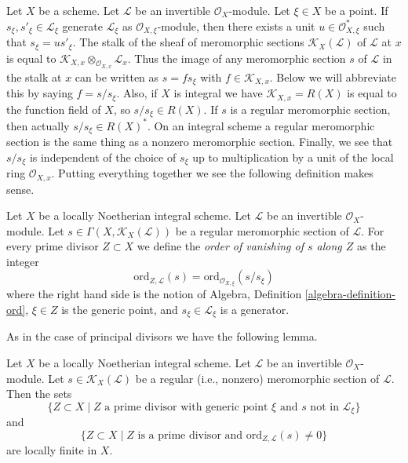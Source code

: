 \medskip\noindent
Let $X$ be a scheme. Let $\mathcal{L}$ be an invertible $\mathcal{O}_X$-module.
Let $\xi \in X$ be a point. If $s_\xi, s'_\xi \in \mathcal{L}_\xi$ generate
$\mathcal{L}_\xi$ as $\mathcal{O}_{X, \xi}$-module, then there exists a unit
$u \in \mathcal{O}_{X, \xi}^*$ such that $s_\xi = u s'_\xi$.
The stalk of the sheaf of meromorphic sections
$\mathcal{K}_X(\mathcal{L})$ of $\mathcal{L}$
at $x$ is equal to
$\mathcal{K}_{X, x} \otimes_{\mathcal{O}_{X, x}} \mathcal{L}_x$.
Thus the image of any meromorphic section $s$
of $\mathcal{L}$ in the stalk at $x$ can be written as $s = fs_\xi$ with
$f \in \mathcal{K}_{X, x}$. Below we will abbreviate this by
saying $f = s/s_\xi$. Also, if $X$ is integral we have
$\mathcal{K}_{X, x} = R(X)$ is equal to the function field of $X$,
so $s/s_\xi \in R(X)$. If $s$ is a regular meromorphic section,
then actually $s/s_\xi \in R(X)^*$. On an integral scheme a regular
meromorphic section is the same thing as a nonzero meromorphic section.
Finally, we see that $s/s_\xi$ is independent of the choice of $s_\xi$ up to
multiplication by a unit of the local ring $\mathcal{O}_{X, x}$.
Putting everything together we see the following definition makes sense.

\begin{definition}
\label{definition-order-vanishing-meromorphic}
Let $X$ be a locally Noetherian integral scheme.
Let $\mathcal{L}$ be an invertible $\mathcal{O}_X$-module.
Let $s \in \Gamma(X, \mathcal{K}_X(\mathcal{L}))$
be a regular meromorphic section of $\mathcal{L}$.
For every prime divisor $Z \subset X$ we define the
{\it order of vanishing of $s$ along $Z$} as the integer
$$
\text{ord}_{Z, \mathcal{L}}(s)
= \text{ord}_{\mathcal{O}_{X, \xi}}(s/s_\xi)
$$
where the right hand side is the notion of
Algebra, Definition \ref{algebra-definition-ord},
$\xi \in Z$ is the generic point,
and $s_\xi \in \mathcal{L}_\xi$ is a generator.
\end{definition}

\noindent
As in the case of principal divisors we have the following lemma.

\begin{lemma}
\label{lemma-divisor-meromorphic-locally-finite}
Let $X$ be a locally Noetherian integral scheme. Let $\mathcal{L}$ be an
invertible $\mathcal{O}_X$-module. Let $s \in \mathcal{K}_X(\mathcal{L})$ be a
regular (i.e., nonzero) meromorphic section of $\mathcal{L}$. Then the sets
$$
\{Z \subset X \mid Z \text{ a prime divisor with generic point }\xi
\text{ and }s\text{ not in }\mathcal{L}_\xi\}
$$
and
$$
\{Z \subset X \mid Z \text{ is a prime divisor and }
\text{ord}_{Z, \mathcal{L}}(s) \not = 0\}
$$
are locally finite in $X$.
\end{lemma}

